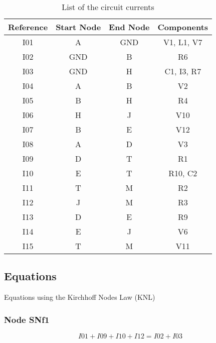 \documentclass[a4paper]{article}
\begin{document}
\begin{table}[ht]
\caption{List of the circuit currents}
\centering
\begin{tabular}{cccc}
\textbf{Reference} & \textbf{Start Node} & \textbf{End Node} & \textbf{Components} \\ \hline
I01                & A                   & GND               & V1, L1, V7          \\
I02                & GND                 & B                 & R6                  \\
I03                & GND                 & H                 & C1, I3, R7          \\
I04                & A                   & B                 & V2                  \\
I05                & B                   & H                 & R4                  \\
I06                & H                   & J                 & V10                 \\
I07                & B                   & E                 & V12                 \\
I08                & A                   & D                 & V3                  \\
I09                & D                   & T                 & R1                  \\
I10                & E                   & T                 & R10, C2             \\
I11                & T                   & M                 & R2                  \\
I12                & J                   & M                 & R3                  \\
I13                & D                   & E                 & R9                  \\
I14                & E                   & J                 & V6                  \\
I15                & T                   & M                 & V11
\end{tabular}
\end{table}

\subsection{Equations}
Equations using the Kirchhoff Nodes Law (KNL)

\subsubsection{Node SNf1}
  \begin{equation}
    I01+I09+I10+I12=I02+I03
  \end{equation}
\end{document}
